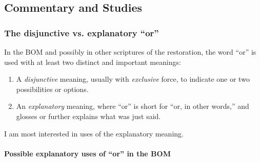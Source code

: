 	
	
	
	
\subsection{Commentary and Studies} %
	\label{OR-COMMENTARY}
	
	\subsubsection{The disjunctive vs. explanatory ``or''}
		\label{OR-COMMENTARY-explanatory}
	
		In the BOM and possibly in other scriptures of the restoration, the word ``or'' is used with at least two distinct and important meanings:
		
		\begin{enumerate}
			\item A \textit{disjunctive} meaning, usually with \textit{exclusive} force, to indicate one or two possibilities or options.
			\item An \textit{explanatory} meaning, where ``or'' is short for ``or, in other words,'' and glosses or further explains what was just said.
		\end{enumerate}
		
		I am most interested in uses of the explanatory meaning.
		
		\paragraph{Possible explanatory uses of ``or'' in the BOM}
		
